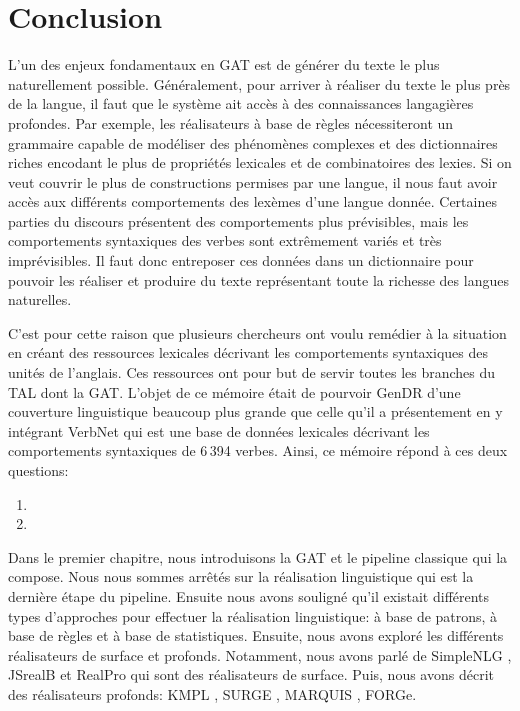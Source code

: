 
\chapter*{Conclusion}
L'un des enjeux fondamentaux en \ac{GAT} est de générer du texte le plus naturellement possible. Généralement, pour arriver à réaliser du texte le plus près de la langue, il faut que le système ait accès à des connaissances langagières profondes. Par exemple, les réalisateurs à base de règles nécessiteront un grammaire capable de modéliser des phénomènes complexes et des dictionnaires riches encodant le plus de propriétés lexicales et de combinatoires des lexies. Si on veut couvrir le plus de constructions permises par une langue, il nous faut avoir accès aux différents comportements des lexèmes d'une langue donnée. Certaines parties du discours présentent des comportements plus prévisibles, mais les comportements syntaxiques des verbes sont extrêmement variés et très imprévisibles. Il faut donc entreposer ces données dans un dictionnaire pour pouvoir les réaliser et produire du texte représentant toute la richesse des langues naturelles.

C'est pour cette raison que plusieurs chercheurs ont voulu remédier à la situation en créant des ressources lexicales décrivant les comportements syntaxiques des unités de l'anglais. Ces ressources ont pour but de servir toutes les branches du \ac{TAL} dont la \ac{GAT}. L'objet de ce mémoire était de pourvoir GenDR d'une couverture linguistique beaucoup plus grande que celle qu'il a présentement en y intégrant VerbNet qui est une base de données lexicales décrivant les comportements syntaxiques de 6\,394 verbes. Ainsi, ce mémoire répond à ces deux questions:

\begin{enumerate}
  \item {}
  \item {}
\end{enumerate}

Dans le premier chapitre, nous introduisons la \ac{GAT} et le pipeline classique qui la compose. Nous nous sommes arrêtés sur la réalisation linguistique qui est la dernière étape du pipeline. Ensuite nous avons souligné qu'il existait différents types d'approches pour effectuer la réalisation linguistique: à base de patrons, à base de règles et à base de statistiques. Ensuite, nous avons exploré les différents réalisateurs de surface et profonds. Notamment, nous avons parlé de SimpleNLG \citep{GattSimpleNLGRealisationEngine2009}, JSrealB \citep{MolinsJSrealBBilingualText2015} et RealPro \citep{LavoieFastPortableRealizer1997} qui sont des réalisateurs de surface. Puis, nous avons décrit des réalisateurs profonds: KMPL \cite{BatemanEnablingTechnologyMultilingual1997}, SURGE \citep{Elhadad98surge:a}, MARQUIS \citep{WannerMARQUISGENERATIONUSERTAILORED2010}, FORGe\citep{MilledemoFORGePompeu2017}.

